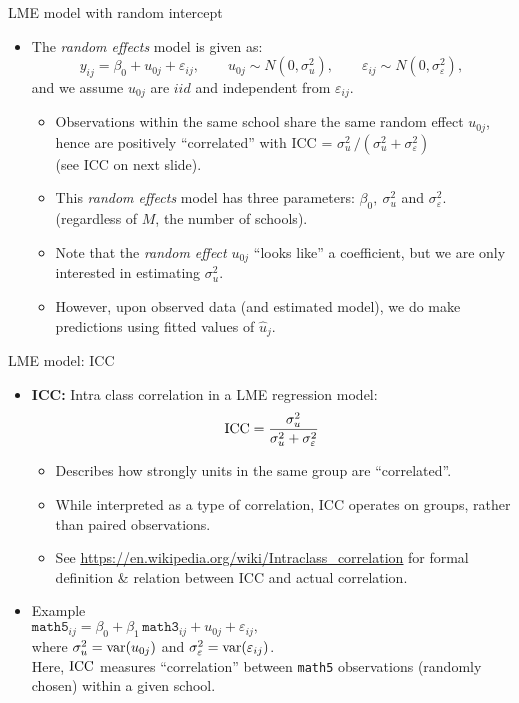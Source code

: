 \documentclass{beamer}
\begin{document}
\begin{frame}{LME model with random intercept}
\begin{itemize}
\item The \textit{random effects} model is given as:
$$ y_{ij} = \beta_{0} + u_{0j} + \varepsilon_{ij}, \qquad u_{0j} \sim N(0,\sigma^2_u), \qquad \varepsilon_{ij} \sim N(0,\sigma^2_{\varepsilon}), $$
and we assume $u_{0j}$ are $iid$ and independent from $\varepsilon_{ij}$.\\
\smallskip
\begin{itemize}
\item Observations within the same school share the same random effect $u_{0j}$, hence are positively ``correlated'' with \textnormal{ICC} = $\sigma^2_u \, / (\sigma^2_u + \sigma^2_{\varepsilon})$ \\ (see ICC on next slide).
\medskip
\item This \textit{random effects} model has three parameters: $\beta_{0},~ \sigma^2_u$ and $\sigma^2_{\varepsilon}$. (regardless of $M$, the number of schools).
\medskip
\item Note that the \textit{random effect} $u_{0j}$ ``looks like'' a coefficient, but we are only interested in estimating $\sigma^2_u$.
\medskip
\item However, upon observed data (and estimated model), we do make predictions using fitted values of $\hat{u}_j$.
\end{itemize}
\end{itemize}
\end{frame}
\begin{frame}{LME model: ICC}
\begin{itemize}
\item \textbf{ICC:} Intra class correlation in a LME regression model: \qquad
$$ \textnormal{ICC}=\frac{\sigma^2_u}{\sigma^2_u + \sigma^2_{\varepsilon}} $$
\begin{itemize}
    \item Describes how strongly units in the same group are ``correlated''.
    \item While interpreted as a type of correlation, ICC operates on groups, rather than paired observations.
    \item See \textcolor{blue}{\underline{\href{https://en.wikipedia.org/wiki/Intraclass_correlation}{https://en.wikipedia.org/wiki/Intraclass\_correlation}}} for formal definition \& relation between ICC and actual correlation.
\end{itemize}
\medskip
\item Example \\ \medskip
$\texttt{math5}_{ij} = \beta_{0} + \beta_1 \, \texttt{math3}_{ij} + u_{0j} + \varepsilon_{ij},$\\ \medskip
where $\sigma^2_u = \textnormal{var}(u_{0j})$ and $\sigma^2_{\varepsilon} = \textnormal{var}(\varepsilon_{ij})$.\\ \smallskip
Here, $\textnormal{ICC}$  measures ``correlation'' between \texttt{math5}  observations (randomly chosen) within a given school.
\end{itemize}
\end{frame}
\end{document}
